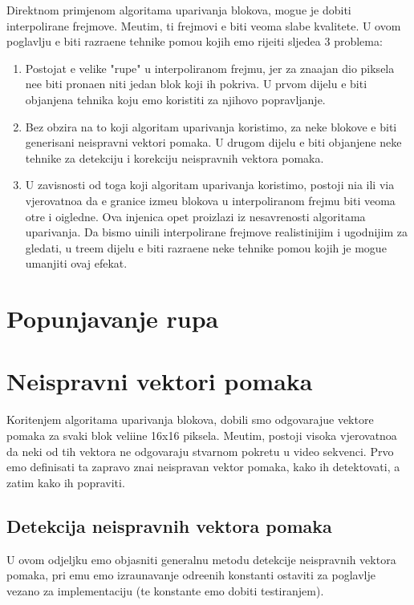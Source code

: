 Direktnom primjenom algoritama uparivanja blokova, mogu\cj e je dobiti interpolirane frejmove. Me\dj utim, ti frejmovi \cj e biti veoma slabe kvalitete. U ovom poglavlju \cj e biti razra\dj ene tehnike pomo\cj u kojih
\cj emo rije\sh iti sljede\cj a 3 problema:
\begin{enumerate}
	\item Postojat \cj e velike "rupe" u interpoliranom frejmu, jer za zna\ch ajan dio piksela ne\cj e biti prona\dj en niti jedan blok koji ih pokriva. U prvom dijelu \cj e biti obja\sh njena tehnika koju \cj emo koristiti
	za njihovo popravljanje.
	\item Bez obzira na to koji algoritam uparivanja koristimo, za neke blokove \cj e biti generisani neispravni vektori pomaka. U drugom dijelu \cj e biti obja\sh njene neke tehnike za detekciju i korekciju
	neispravnih vektora pomaka.
	\item U zavisnosti od toga koji algoritam uparivanja koristimo, postoji ni\zh a ili vi\sh a vjerovatno\cj a da \cj e granice izme\dj u blokova u interpoliranom frejmu biti veoma o\sh tre i o\ch igledne. Ova 
	\ch injenica opet proizlazi iz nesavr\sh enosti algoritama uparivanja. Da bismo u\ch inili interpolirane frejmove realisti\ch nijim i ugodnijim za gledati, u tre\cj em dijelu \cj e biti razra\dj ene neke tehnike pomo\cj u kojih je
	mogu\cj e umanjiti ovaj efekat.
\end{enumerate}

\section{Popunjavanje rupa}

\section{Neispravni vektori pomaka}
Kori\sh tenjem algoritama uparivanja blokova, dobili smo odgovaraju\cj e vektore pomaka za svaki blok veli\ch ine 16x16 piksela. Me\dj utim, postoji visoka vjerovatno\cj a da neki od tih vektora ne odgovaraju stvarnom pokretu
u video sekvenci. Prvo \cj emo definisati \sh ta zapravo zna\ch i neispravan vektor pomaka, kako ih detektovati, a zatim kako ih popraviti. %

\subsection{Detekcija neispravnih vektora pomaka} %
U ovom odjeljku \cj emo objasniti generalnu metodu detekcije neispravnih vektora pomaka, pri \ch emu \cj emo izra\ch unavanje odre\dj enih konstanti ostaviti za poglavlje vezano za implementaciju (te konstante \cj emo dobiti
testiranjem).

